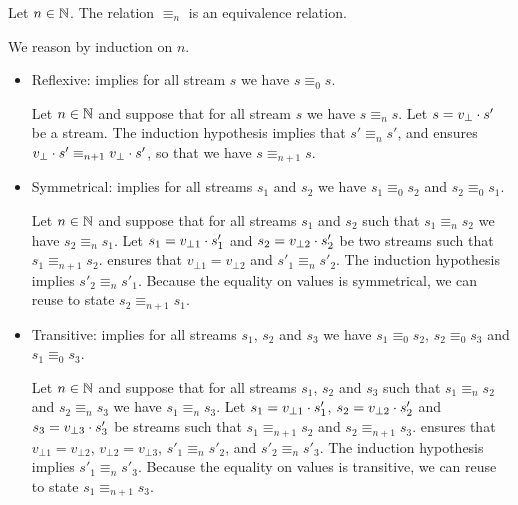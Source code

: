 \begin{lemma}
    Let $n \in \mathbb{N}$.
    The relation $\equiv_n$ is an equivalence relation.
\end{lemma}
\begin{skippableproof}
    We reason by induction on $n$.
    \begin{itemize}
        \item Reflexive:  implies for all stream $s$ we
              have $s \equiv_0 s$.

              Let $n \in \mathbb{N}$ and suppose that for all stream $s$ we have $s \equiv_n s$.
              Let $s = v_\bot \cdot s'$ be a stream. The induction hypothesis implies that
              $s' \equiv_n s'$, and  ensures
              $v_\bot \cdot s' \equiv_{n+1} v_\bot \cdot s'$, so that we have $s \equiv_{n+1} s$.

        \item Symmetrical:  implies for all streams
              $s_1$ and $s_2$ we have $s_1 \equiv_0 s_2$ and $s_2 \equiv_0 s_1$.

              Let $n \in \mathbb{N}$ and suppose that for all streams $s_1$ and $s_2$ such that
              $s_1 \equiv_n s_2$ we have $s_2 \equiv_n s_1$.
              Let $s_1 = v_{\bot1} \cdot s'_1$ and $s_2 = v_{\bot2} \cdot s'_2$ be two streams such
              that $s_1 \equiv_{n+1} s_2$.  ensures
              that $v_{\bot1} = v_{\bot2}$ and $s'_1 \equiv_n s'_2$. The induction hypothesis
              implies $s'_2 \equiv_n s'_1$. Because the equality on values is symmetrical, we can
              reuse  to state $s_2 \equiv_{n+1} s_1$.

        \item Transitive:  implies for all streams
              $s_1$, $s_2$ and $s_3$ we have $s_1 \equiv_0 s_2$, $s_2 \equiv_0 s_3$ and
              $s_1 \equiv_0 s_3$.

              Let $n \in \mathbb{N}$ and suppose that for all streams $s_1$, $s_2$ and $s_3$ such
              that $s_1 \equiv_n s_2$ and $s_2 \equiv_n s_3$ we have $s_1 \equiv_n s_3$.
              Let $s_1 = v_{\bot1} \cdot s'_1$, $s_2 = v_{\bot2} \cdot s'_2$ and
              $s_3 = v_{\bot3} \cdot s'_3$ be streams such that $s_1 \equiv_{n+1} s_2$ and
              $s_2 \equiv_{n+1} s_3$.  ensures
              that $v_{\bot1} = v_{\bot2}$, $v_{\bot2} = v_{\bot3}$, $s'_1 \equiv_n s'_2$, and
              $s'_2 \equiv_n s'_3$. The induction hypothesis implies $s'_1 \equiv_n s'_3$. Because
              the equality on values is transitive, we can reuse
               to state $s_1 \equiv_{n+1} s_3$.
    \end{itemize}
\end{skippableproof}

